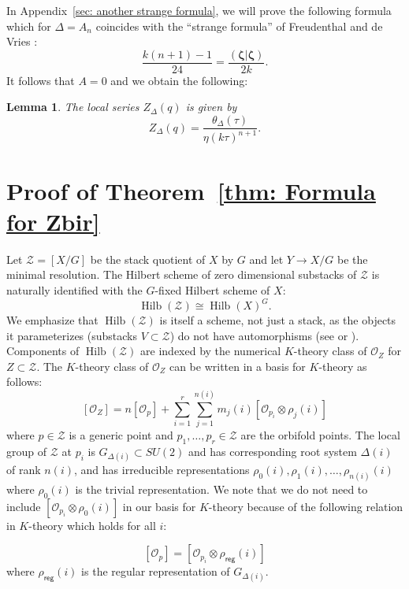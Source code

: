 \documentclass{amsart}
\newtheorem{lemma}[theorem]{Lemma}
\theoremstyle{definition}
\newcommand{\reg}{\mathsf{reg}}
\renewcommand{\O}{\mathcal{O}}
\newcommand{\Zcal}{\mathcal{Z}}
\newcommand{\zetavec}{\bm{\zeta }}
\newcommand{\Hilb}{\operatorname{Hilb}}
\begin{document}
In Appendix~\ref{sec: another strange formula}, we will prove the
following formula which for $\Delta =A_{n}$ coincides with the
``strange formula'' of Freudenthal and de Vries
\cite{freudenthal1969linear}:
\[
 \frac{k(n+1)-1}{24}  = \frac{(\zetavec |\zetavec )}{2k}.
\]
It follows that $A=0$ and we obtain the following:
\begin{lemma}\label{lem: local series as theta/eta} The local series
$Z_{\Delta}(q)$ is given by
\[
Z_{\Delta}(q) = \frac{\theta_{\Delta}(\tau )}{\eta (k\tau )^{n+1}}. 
\]
\end{lemma}


\section{Proof of Theorem~\ref{thm: Formula for Zbir}}
\label{sec: proof of thm about Zbir}

Let $\Zcal  =[X/G]$ be the stack quotient of $X$ by $G$ and let $Y\to
X/G$ be the minimal resolution. %
The Hilbert scheme of zero dimensional substacks of $\Zcal$ is
naturally identified with the $G$-fixed Hilbert scheme of $X$:
\[
\Hilb (\Zcal )\cong \Hilb (X)^{G}.
\]
We emphasize that $\Hilb (\Zcal )$ is itself a scheme, not just a
stack, as the objects it parameterizes (substacks $V\subset \Zcal $)
do not have automorphisms (see \cite{Olsson-Starr} or
\cite[\S~2.3]{Bryan-Cadman-Young}). Components of $\Hilb (\Zcal )$ are
indexed by the numerical $K$-theory class of $\O_{Z}$ for $Z\subset
\Zcal$. The $K$-theory class of $\O_{Z}$ can be written in a basis for
$K$-theory as follows:
\[
[\O_{Z}] = n[\O_{p}] + \sum_{i=1}^{r} \sum_{j=1}^{n(i)}
m_{j}(i)[\O_{p_{i}}\otimes \rho_{j}(i)] 
\]
where $p\in \Zcal$ is a generic point and $p_{1},\dotsc ,p_{r}\in \Zcal$
are the orbifold points. The local group of $\Zcal$ at $p_{i}$ is
$G_{\Delta (i)}\subset SU(2)$  and has corresponding root system
$\Delta (i)$ of rank $n(i)$, and has irreducible representations
$\rho_{0}(i),\rho_{1}(i),\dotsc ,\rho_{n(i)}(i)$ where $\rho_{0}(i)$
is the trivial representation. 
We note that we do not need to include $ [\O_{p_{i}}\otimes
\rho_{0}(i)]$ in our basis for $K$-theory because of the following
relation in  $K$-theory which holds for all $i$:

\begin{equation}\label{eqn: Op = O0timesrhoreg}
[\O_{p}] = [\O_{p_{i}}\otimes \rho_{\reg}(i)]
\end{equation}
where $\rho_{\reg}(i)$ is the regular representation of
$G_{\Delta(i)}$.
\end{document}
